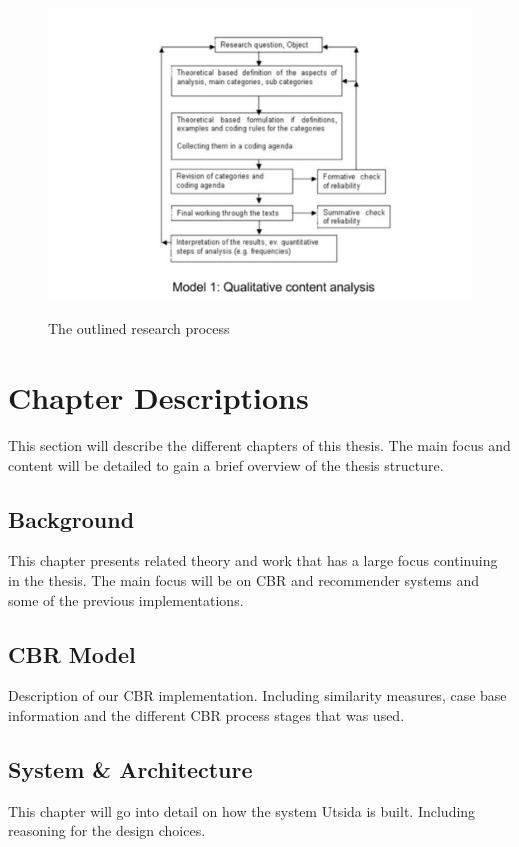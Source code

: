 \begin{figure}
    \centering
    \includegraphics[width=\textwidth]{fig/method.png}
    \label{fig:my_label}
    \caption{The outlined research process\cite{oates2005researching}}
\end{figure}


\section{Chapter Descriptions}
This section will describe the different chapters of this thesis. The main focus and content will be detailed to gain a brief overview of the thesis structure. 

\subsection{Background}
This chapter presents related theory and work that has a large focus continuing in the thesis. The main focus will be on CBR and recommender systems and some of the previous implementations.  

\subsection{CBR Model}
Description of our CBR implementation. Including similarity measures, case base information and the different CBR process stages that was used. 

\subsection{System \& Architecture}
This chapter will go into detail on how the system Utsida is built. Including reasoning for the design choices. 

